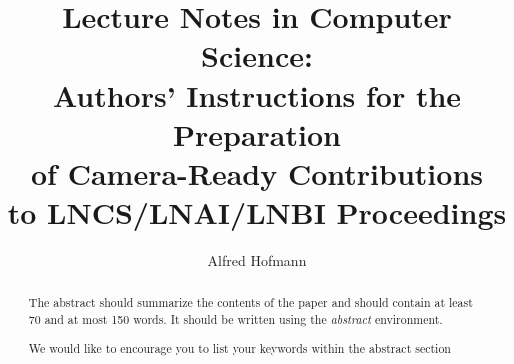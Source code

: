 \documentclass[runningheads,a4paper]{llncs}
\newcommand{\keywords}[1]{\par\addvspace\baselineskip
\noindent\keywordname\enspace\ignorespaces#1}
\begin{document}
\mainmatter  %

\title{Lecture Notes in Computer Science:\\Authors' Instructions
for the Preparation\\of Camera-Ready
Contributions\\to LNCS/LNAI/LNBI Proceedings}


%
%
\author{Alfred Hofmann}%

%


%
%

\maketitle


\begin{abstract}
The abstract should summarize the contents of the paper and should
contain at least 70 and at most 150 words. It should be written using the
\emph{abstract} environment.
\keywords{We would like to encourage you to list your keywords within
the abstract section}
\end{abstract}
\end{document}
